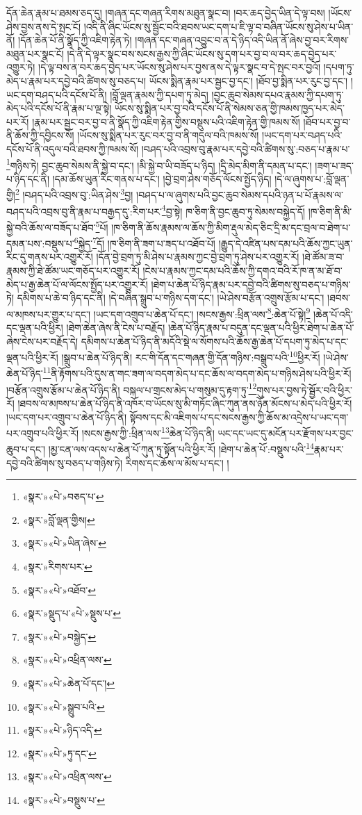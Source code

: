 དོན་ཆེན་རྣམ་པ་ཐམས་ཅད་དུ། །གཞན་དང་གཞན་རིགས་མཐུན་སྣང་བ། །བར་ཆད་བྱེད་ཡིན་དེ་ལྟ་བས། །ཡོངས་ཤེས་བྱས་ནས་དེ་སྤང་ངོ། །འདི་ནི་ཞིང་ཡོངས་སུ་སྦྱོང་བའི་ཐབས་ཡང་དག་པ་ཇི་ལྟ་བ་བཞིན་ཡོངས་སུ་ཤེས་པ་ཡིན་ནོ། །དོན་ཆེན་པོ་ནི་སྣོད་ཀྱི་འཇིག་རྟེན་ཏེ། །གཞན་དང་གཞན་འབྱུང་བ་ན་དེ་ཉིད་འདི་ཡིན་ནོ་ཞེས་བྱ་བར་རིགས་མཐུན་པར་སྣང་ངོ། །དེ་ནི་དེ་ལྟར་སྣང་བས་སངས་རྒྱས་ཀྱི་ཞིང་ཡོངས་སུ་དག་པར་བྱ་བ་ལ་བར་ཆད་བྱེད་པར་འགྱུར་ཏེ། །དེ་ལྟ་བས་ན་བར་ཆད་བྱེད་པར་ཡོངས་སུ་ཤེས་པར་བྱས་ནས་དེ་ལྟར་སྣང་བ་དེ་སྤང་བར་བྱའོ། །དཔག་ཏུ་མེད་པ་རྣམ་པར་དབྱེ་བའི་ཚིགས་སུ་བཅད་པ། ཡོངས་སྨིན་རྣམ་པར་སྦྱང་བྱ་དང་། །ཐོབ་བྱ་སྨིན་པར་རུང་བྱ་དང་། །ཡང་དག་བཤད་པའི་དངོས་པོ་ནི། །བློ་ལྡན་རྣམས་ཀྱི་དཔག་ཏུ་མེད། །བྱང་ཆུབ་སེམས་དཔའ་རྣམས་ཀྱི་དཔག་ཏུ་མེད་པའི་དངོས་པོ་ནི་རྣམ་པ་ལྔ་སྟེ། ཡོངས་སུ་སྨིན་པར་བྱ་བའི་དངོས་པོ་ནི་སེམས་ཅན་གྱི་ཁམས་ཁྱད་པར་མེད་པར་རོ། །རྣམ་པར་སྦྱང་བར་བྱ་བ་ནི་སྣོད་ཀྱི་འཇིག་རྟེན་གྱིས་བསྡུས་པའི་འཇིག་རྟེན་གྱི་ཁམས་སོ། །ཐོབ་པར་བྱ་བ་ནི་ཆོས་ཀྱི་དབྱིངས་སོ། །ཡོངས་སུ་སྨིན་པར་རུང་བར་བྱ་བ་ནི་གདུལ་བའི་ཁམས་སོ། །ཡང་དག་པར་བཤད་པའི་དངོས་པོ་ནི་འདུལ་བའི་ཐབས་ཀྱི་ཁམས་སོ། །བཤད་པའི་འབྲས་བུ་རྣམ་པར་དབྱེ་བའི་ཚིགས་སུ་:བཅད་པ་རྣམ་པ་\footnote{«སྣར་»«པེ་»བཅད་པ་}གཉིས་ཏེ། བྱང་ཆུབ་སེམས་ནི་སྐྱེ་བ་དང་། །མི་སྐྱེ་བ་ཡི་བཟོད་པ་ཉིད། །དྲི་མེད་མིག་ནི་དམན་པ་དང་། །ཟག་པ་ཟད་པ་ཉིད་དང་ནི། །དམ་ཆོས་ཡུན་རིང་གནས་པ་དང་། །བྱེ་བྲག་ཤེས་གཅོད་ལོངས་སྤྱོད་ཉིད། །དེ་ལ་ཞུགས་པ་:བློ་ལྡན་གྱི།\footnote{«སྣར་»བློ་ལྡན་གྱིས།} །བཤད་པའི་འབྲས་བུ་:ཡིན་ཤེས་\footnote{«སྣར་»«པེ་»ཡིན་ཞེས་}བྱ། །བཤད་པ་ལ་ཞུགས་པའི་བྱང་ཆུབ་སེམས་དཔའི་ཉན་པ་པོ་རྣམས་ལ་བཤད་པའི་འབྲས་བུ་ནི་རྣམ་པ་བརྒྱད་དུ་:རིག་པར་\footnote{«སྣར་»རིགས་པར་}བྱ་སྟེ། ཁ་ཅིག་ནི་བྱང་ཆུབ་ཏུ་སེམས་བསྐྱེད་དོ། །ཁ་ཅིག་ནི་མི་སྐྱེ་བའི་ཆོས་ལ་བཟོད་པ་ཐོབ་\footnote{«སྣར་»«པེ་»འཐོབ་}པོ། །ཁ་ཅིག་ནི་ཆོས་རྣམས་ལ་ཆོས་ཀྱི་མིག་རྡུལ་མེད་ཅིང་དྲི་མ་དང་བྲལ་བ་ཐེག་པ་དམན་པས་:བསྡུས་པ་\footnote{«སྣར་»སྡུད་པ་«པེ་»སྡུས་པ་}སྐྱེད་\footnote{«སྣར་»«པེ་»བསྐྱེད་}དོ། །ཁ་ཅིག་ནི་ཟག་པ་ཟད་པ་འཐོབ་པོ། །རྒྱུད་དེ་འཛིན་པས་དམ་པའི་ཆོས་ཀྱང་ཡུན་རིང་དུ་གནས་པར་འགྱུར་རོ། །དོན་བྱེ་བྲག་ཏུ་མི་ཤེས་པ་རྣམས་ཀྱང་བྱེ་བྲག་ཏུ་ཤེས་པར་འགྱུར་རོ། །ཐེ་ཚོམ་ཟ་བ་རྣམས་ཀྱི་ཐེ་ཚོམ་ཡང་གཅོད་པར་འགྱུར་རོ། །ངེས་པ་རྣམས་ཀྱང་དམ་པའི་ཆོས་ཀྱི་དགའ་བའི་རོ་ཁ་ན་མ་ཐོ་བ་མེད་པ་རྒྱ་ཆེན་པོ་ལ་ལོངས་སྤྱོད་པར་འགྱུར་རོ། །ཐེག་པ་ཆེན་པོ་ཉིད་རྣམ་པར་དབྱེ་བའི་ཚིགས་སུ་བཅད་པ་གཉིས་ཏེ། དམིགས་པ་ཆེ་བ་ཉིད་དང་ནི། །དེ་བཞིན་སྒྲུབ་པ་གཉིས་དག་དང་། །ཡེ་ཤེས་བརྩོན་འགྲུས་རྩོམ་པ་དང་། །ཐབས་ལ་མཁས་པར་གྱུར་པ་དང་། །ཡང་དག་འགྲུབ་པ་ཆེན་པོ་དང་། །སངས་རྒྱས་:ཕྲིན་ལས་\footnote{«སྣར་»«པེ་»འཕྲིན་ལས་}:ཆེན་པོ་སྟེ།\footnote{«སྣར་»«པེ་»ཆེན་པོ་དང་།} །ཆེན་པོ་འདི་དང་ལྡན་པའི་ཕྱིར། །ཐེག་ཆེན་ཞེས་ནི་ངེས་པ་བརྗོད། །ཆེན་པོ་ཉིད་རྣམ་པ་བདུན་དང་ལྡན་པའི་ཕྱིར་ཐེག་པ་ཆེན་པོ་ཞེས་ངེས་པར་བརྗོད་དེ། དམིགས་པ་ཆེན་པོ་ཉིད་ནི་མདོའི་སྡེ་ལ་སོགས་པའི་ཆོས་རྒྱ་ཆེན་པོ་དཔག་ཏུ་མེད་པ་དང་ལྡན་པའི་ཕྱིར་རོ། །སྒྲུབ་པ་ཆེན་པོ་ཉིད་ནི། རང་གི་དོན་དང་གཞན་གྱི་དོན་གཉིས་:བསྒྲུབ་པའི་\footnote{«སྣར་»«པེ་»སྒྲུབ་པའི་}ཕྱིར་རོ། །ཡེ་ཤེས་ཆེན་པོ་ཉིད་\footnote{«སྣར་»«པེ་»ཉིད་འདི་}ནི་རྟོགས་པའི་དུས་ན་གང་ཟག་ལ་བདག་མེད་པ་དང་ཆོས་ལ་བདག་མེད་པ་གཉིས་ཤེས་པའི་ཕྱིར་རོ། །བརྩོན་འགྲུས་རྩོམ་པ་ཆེན་པོ་ཉིད་ནི། བསྐལ་པ་གྲངས་མེད་པ་གསུམ་དུ་རྟག་ཏུ་\footnote{«སྣར་»«པེ་»ཏུ་དང་}གུས་པར་བྱས་ཏེ་སྦྱོར་བའི་ཕྱིར་རོ། །ཐབས་ལ་མཁས་པ་ཆེན་པོ་ཉིད་ནི་འཁོར་བ་ཡོངས་སུ་མི་གཏོང་ཞིང་ཀུན་ནས་ཉོན་མོངས་པ་མེད་པའི་ཕྱིར་རོ། །ཡང་དག་པར་འགྲུབ་པ་ཆེན་པོ་ཉིད་ནི། སྟོབས་དང་མི་འཇིགས་པ་དང་སངས་རྒྱས་ཀྱི་ཆོས་མ་འདྲེས་པ་ཡང་དག་པར་འགྲུབ་པའི་ཕྱིར་རོ། །སངས་རྒྱས་ཀྱི་:ཕྲིན་ལས་\footnote{«སྣར་»«པེ་»འཕྲིན་ལས་}ཆེན་པོ་ཉིད་ནི། ཡང་དང་ཡང་དུ་མངོན་པར་རྫོགས་པར་བྱང་ཆུབ་པ་དང་། །མྱ་ངན་ལས་འདས་པ་ཆེན་པོ་ཀུན་ཏུ་སྟོན་པའི་ཕྱིར་རོ། །ཐེག་པ་ཆེན་པོ་:བསྡུས་པའི་\footnote{«སྣར་»«པེ་»བསྡུས་པ་}རྣམ་པར་དབྱེ་བའི་ཚིགས་སུ་བཅད་པ་གཉིས་ཏེ། རིགས་དང་ཆོས་ལ་མོས་པ་དང་། །
